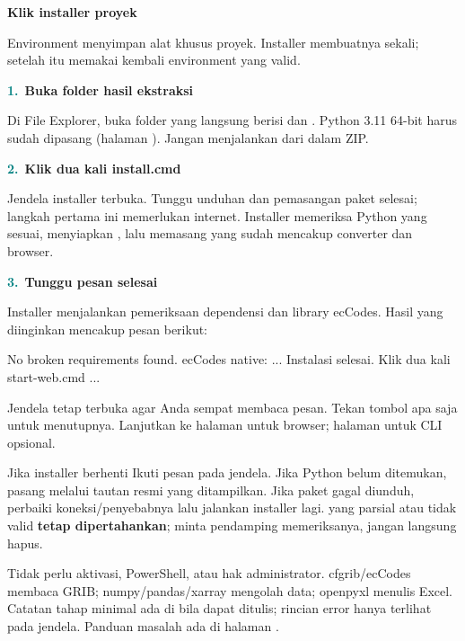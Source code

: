 \documentclass[11pt,a4paper]{article}
\newcommand{\step}[2]{\par\addvspace{2mm}\noindent\textcolor{teal}{\textbf{#1.}}\ \textbf{#2}\par\nobreak}
\newcommand{\pagetitle}[3]{\clearpage{\color{teal}\small\bfseries LANGKAH #1}\par{\color{slate}\LARGE\bfseries #2}\par\vspace{2mm}#3\par\vspace{3mm}}
\begin{document}
\pagetitle{4}{Klik installer proyek}{Environment  menyimpan alat khusus proyek. Installer membuatnya sekali; setelah itu memakai kembali environment yang valid.}
\label{pg:packages}
\step{1}{Buka folder hasil ekstraksi}
Di File Explorer, buka folder yang langsung berisi  dan
. Python 3.11 64-bit harus sudah dipasang
(halaman \pageref{pg:python}). Jangan menjalankan dari dalam ZIP.
\step{2}{Klik dua kali install.cmd}
Jendela installer terbuka. Tunggu unduhan dan pemasangan paket selesai;
langkah pertama ini memerlukan internet. Installer memeriksa Python yang
sesuai, menyiapkan , lalu memasang 
yang sudah mencakup converter dan browser.
\par\noindent{}\par
\step{3}{Tunggu pesan selesai}
Installer menjalankan pemeriksaan dependensi dan library ecCodes. Hasil yang
diinginkan mencakup pesan berikut:
\begin{terminal}
No broken requirements found.
ecCodes native: ...
Instalasi selesai. Klik dua kali start-web.cmd ...
\end{terminal}
Jendela tetap terbuka agar Anda sempat membaca pesan. Tekan tombol apa saja
untuk menutupnya. Lanjutkan ke halaman \pageref{pg:web-start} untuk browser;
halaman \pageref{pg:convert} untuk CLI opsional.
\begin{panel}{Jika installer berhenti}
Ikuti pesan pada jendela. Jika Python belum ditemukan, pasang melalui tautan
resmi yang ditampilkan. Jika paket gagal diunduh, perbaiki koneksi/penyebabnya
lalu jalankan installer lagi.  yang parsial atau tidak valid
\textbf{tetap dipertahankan}; minta pendamping memeriksanya, jangan langsung hapus.
\end{panel}
Tidak perlu aktivasi, PowerShell, atau hak administrator. cfgrib/ecCodes membaca
GRIB; numpy/pandas/xarray mengolah data; openpyxl menulis Excel. Catatan tahap
minimal ada di  bila dapat ditulis;
rincian error hanya terlihat pada jendela. Panduan masalah ada di halaman
\pageref{pg:troubleshooting}.
\end{document}
